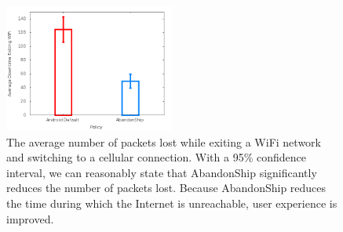 \begin{figure}
	\includegraphics[width=0.5\textwidth]{bars}
	\caption{The average number of packets lost while exiting a WiFi network and switching to a cellular connection. With a 95\% confidence interval, we can reasonably state that AbandonShip significantly reduces the number of packets lost. Because AbandonShip reduces the time during which the Internet is unreachable, user experience is improved.}
\end{figure}
